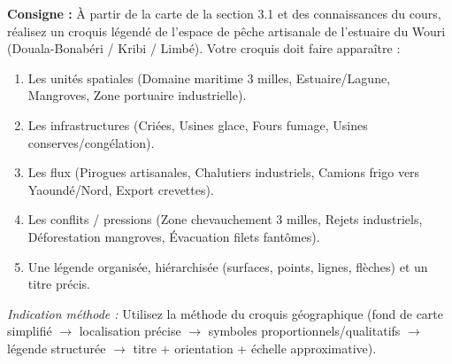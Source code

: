 \documentclass[11pt]{article}
\begin{document}
\begin{exercice}
\textbf{Consigne :} À partir de la carte de la section 3.1 et des connaissances du cours, réalisez un croquis légendé de l'espace de pêche artisanale de l'estuaire du Wouri (Douala-Bonabéri / Kribi / Limbé). Votre croquis doit faire apparaître :
\begin{enumerate}
\item Les unités spatiales (Domaine maritime 3 milles, Estuaire/Lagune, Mangroves, Zone portuaire industrielle).
\item Les infrastructures (Criées, Usines glace, Fours fumage, Usines conserves/congélation).
\item Les flux (Pirogues artisanales, Chalutiers industriels, Camions frigo vers Yaoundé/Nord, Export crevettes).
\item Les conflits / pressions (Zone chevauchement 3 milles, Rejets industriels, Déforestation mangroves, Évacuation filets fantômes).
\item Une légende organisée, hiérarchisée (surfaces, points, lignes, flèches) et un titre précis.
\end{enumerate}
\textit{Indication méthode :} Utilisez la méthode du croquis géographique (fond de carte simplifié $\rightarrow$ localisation précise $\rightarrow$ symboles proportionnels/qualitatifs $\rightarrow$ légende structurée $\rightarrow$ titre + orientation + échelle approximative).
\end{exercice}
\end{document}
